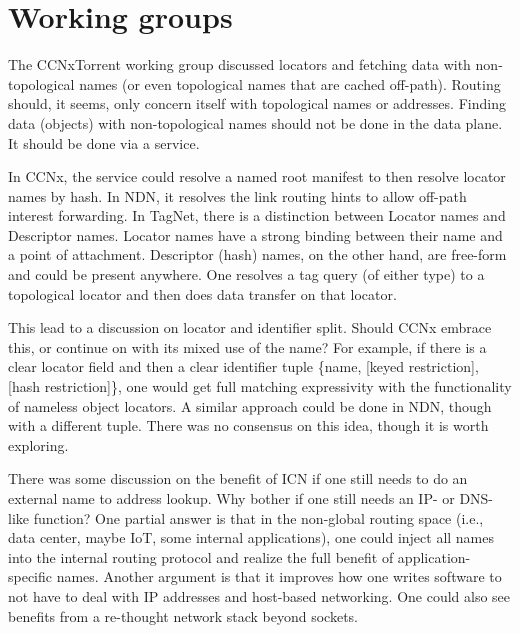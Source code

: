 \documentclass[a4paper,UKenglish]{dagrep}
\begin{document}


\section{Working groups}

\license

The CCNxTorrent working group discussed locators and fetching data with non-topological names (or even topological names that are cached off-path). Routing should, it seems, only concern itself with topological names or addresses.  Finding data (objects) with non-topological names should not be done in the data plane.  It should be done via a service.

In CCNx, the service could resolve a named root manifest to then resolve locator names by hash.
In NDN, it resolves the link routing hints to allow off-path interest forwarding. In TagNet,
there is a distinction between Locator names and Descriptor names. Locator names have a
strong binding between their name and a point of attachment. Descriptor (hash) names, on the
other hand, are free-form and could be present anywhere.  One resolves a tag query (of either
type) to a topological locator and then does data transfer on that locator.

This lead to a discussion on locator and identifier split.  Should CCNx embrace this, or continue on with its mixed use of the name? For example, if there is a clear locator field and then a clear identifier tuple \{name, [keyed restriction], [hash restriction]\}, one would get full matching expressivity with the functionality of nameless object locators.  A similar approach could be done in NDN, though with a different tuple.  There was no consensus on this idea, though it is worth exploring.

There was some discussion on the benefit of ICN if one still needs to do an external name to address lookup.  Why bother if one still needs an IP- or DNS-like function?  One partial answer is that in the non-global routing space (i.e., data center, maybe IoT, some internal applications), one could inject all names into the internal routing protocol and realize the full benefit of application-specific names.  Another argument is that it improves how one writes software to not have to deal with IP addresses and host-based networking. One could also see benefits from a re-thought network stack beyond sockets.
\end{document}
